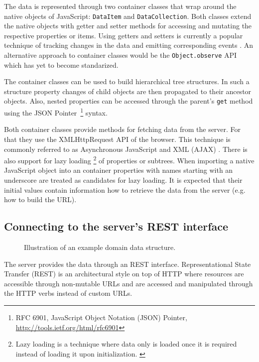 The data is represented through two container classes that wrap around the native objects of JavaScript: \texttt{DataItem} and \texttt{DataCollection}. Both classes extend the native objects with getter and setter methods for accessing and mutating the respective properties or items. Using getters and setters is currently a popular technique of tracking changes in the data and emitting corresponding events . An alternative approach to container classes would be the \texttt{Object.observe} API \cite{Waldron_2012} which has yet to become standarized.

The container classes can be used to build hierarchical tree structures. In such a structure property changes of child objects are then propagated to their ancestor objects. Also, nested properties can be accessed through the parent's \texttt{get} method using the JSON Pointer \footnote{RFC 6901, JavaScript Object Notation (JSON) Pointer, \url{http://tools.ietf.org/html/rfc6901}} syntax.

Both container classes provide methods for fetching data from the server. For that they use the XMLHttpRequest \cite{W3C_XHR} API of the browser. This technique is commonly referred to as Asynchronous JavaScript and XML (AJAX) \cite{Garrett_2005}. There is also support for lazy loading \footnote{Lazy loading is a technique where data only is loaded once it is required instead of loading it upon initialization. \cite{Fowler_2002}} of properties or subtrees. When importing a native JavaScript object into an container properties with names starting with an underscore are treated as candidates for lazy loading. It is expected that their initial values contain information how to retrieve the data from the server (e.g. how to build the URL).

\subsection{Connecting to the server's REST interface}

\begin{figure}
\caption{Illustration of an example domain data structure.}
\label{fig:projectstruc}
\end{figure}

The server provides the data through an REST interface. Representational State Transfer (REST) is an architectural style on top of HTTP where resources are accessible through non-mutable URLs and are accessed and manipulated through the HTTP verbs instead of custom URLs. \cite{Fielding_2000} 

